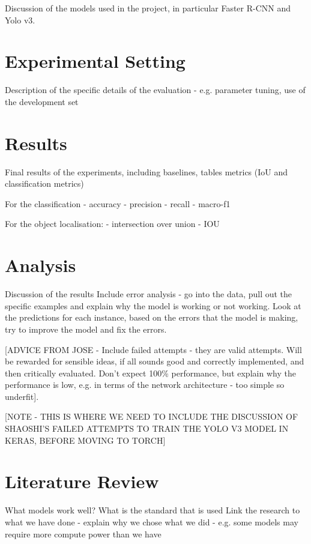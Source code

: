 \documentclass{article}
\begin{document}
Discussion of the models used in the project, in particular Faster R-CNN and Yolo v3.

\section{Experimental Setting}

Description of the specific details of the evaluation - e.g. parameter tuning, use of the development set


\section{Results}

Final results of the experiments, including baselines, tables metrics (IoU and classification metrics)

For the classification
- accuracy
- precision
- recall
- macro-f1

For the object localisation:
- intersection over union - IOU

\section{Analysis}

Discussion of the results
Include error analysis - go into the data, pull out the specific examples and explain why the model is working or not working. Look at the predictions for each instance, based on the errors that the model is making, try to improve the model and fix the errors.

[ADVICE FROM JOSE - Include failed attempts - they are valid attempts. Will be rewarded for sensible ideas, if all sounds good and correctly implemented, and then critically evaluated. Don't expect 100\% performance, but explain why the performance is low, e.g. in terms of the network architecture - too simple so underfit].

[NOTE - THIS IS WHERE WE NEED TO INCLUDE THE DISCUSSION OF SHAOSHI'S FAILED ATTEMPTS TO TRAIN THE YOLO V3 MODEL IN KERAS, BEFORE MOVING TO TORCH]


\section{Literature Review}

What models work well?
What is the standard that is used
Link the research to what we have done - explain why we chose what we did - e.g.
some models may require more compute power than we have
\end{document}
